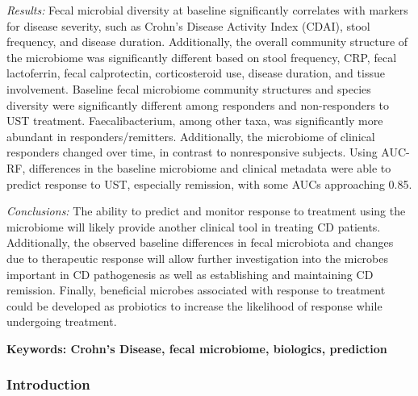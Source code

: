 \documentclass[11pt,]{article}
\begin{document}
\emph{Results:} Fecal microbial diversity at baseline significantly
correlates with markers for disease severity, such as Crohn's Disease
Activity Index (CDAI), stool frequency, and disease duration.
Additionally, the overall community structure of the microbiome was
significantly different based on stool frequency, CRP, fecal
lactoferrin, fecal calprotectin, corticosteroid use, disease duration,
and tissue involvement. Baseline fecal microbiome community structures
and species diversity were significantly different among responders and
non-responders to UST treatment. Faecalibacterium, among other taxa, was
significantly more abundant in responders/remitters. Additionally, the
microbiome of clinical responders changed over time, in contrast to
nonresponsive subjects. Using AUC-RF, differences in the baseline
microbiome and clinical metadata were able to predict response to UST,
especially remission, with some AUCs approaching 0.85.

\emph{Conclusions:} The ability to predict and monitor response to
treatment using the microbiome will likely provide another clinical tool
in treating CD patients. Additionally, the observed baseline differences
in fecal microbiota and changes due to therapeutic response will allow
further investigation into the microbes important in CD pathogenesis as
well as establishing and maintaining CD remission. Finally, beneficial
microbes associated with response to treatment could be developed as
probiotics to increase the likelihood of response while undergoing
treatment.

\textbf{Keywords: Crohn's Disease, fecal microbiome, biologics,
prediction}

\newpage

\subsubsection{Introduction}\label{introduction}
\end{document}
